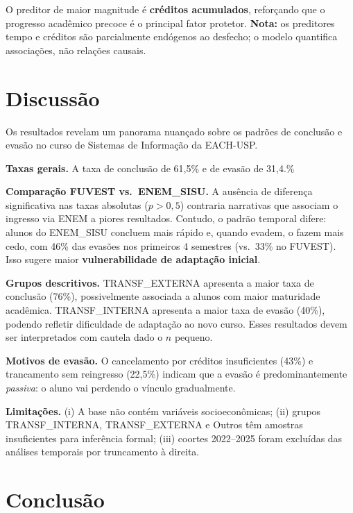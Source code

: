 \documentclass[12pt, a4paper]{article}
\begin{document}
O preditor de maior magnitude é \textbf{créditos acumulados}, reforçando
que o progresso acadêmico precoce é o principal fator protetor.
\textbf{Nota:} os preditores tempo e créditos são parcialmente endógenos
ao desfecho; o modelo quantifica associações, não relações causais.

\section{Discussão}

Os resultados revelam um panorama nuançado sobre os padrões de conclusão e
evasão no curso de Sistemas de Informação da EACH-USP.

\textbf{Taxas gerais.} A taxa de conclusão de 61,5\% e de evasão de 31,4.\%

\textbf{Comparação FUVEST vs.\ ENEM\_SISU.} A ausência de diferença
significativa nas taxas absolutas ($p > 0{,}5$) contraria narrativas que
associam o ingresso via ENEM a piores resultados. Contudo, o padrão temporal
difere: alunos do ENEM\_SISU concluem mais rápido e, quando evadem, o fazem
mais cedo, com 46\% das evasões nos primeiros 4 semestres (vs.\ 33\% no
FUVEST). Isso sugere maior \textbf{vulnerabilidade de adaptação inicial}.

\textbf{Grupos descritivos.} TRANSF\_EXTERNA apresenta a maior taxa de
conclusão (76\%), possivelmente associada a alunos com maior maturidade
acadêmica. TRANSF\_INTERNA apresenta a maior taxa de evasão (40\%),
podendo refletir dificuldade de adaptação ao novo curso. Esses resultados
devem ser interpretados com cautela dado o $n$ pequeno.

\textbf{Motivos de evasão.} O cancelamento por créditos insuficientes
(43\%) e trancamento sem reingresso (22,5\%) indicam que a evasão é
predominantemente \emph{passiva}: o aluno vai perdendo o vínculo
gradualmente.

\textbf{Limitações.} (i) A base não contém variáveis socioeconômicas;
(ii) grupos TRANSF\_INTERNA, TRANSF\_EXTERNA e Outros têm amostras
insuficientes para inferência formal; (iii) coortes 2022--2025 foram
excluídas das análises temporais por truncamento à direita.

\section{Conclusão}
\end{document}
